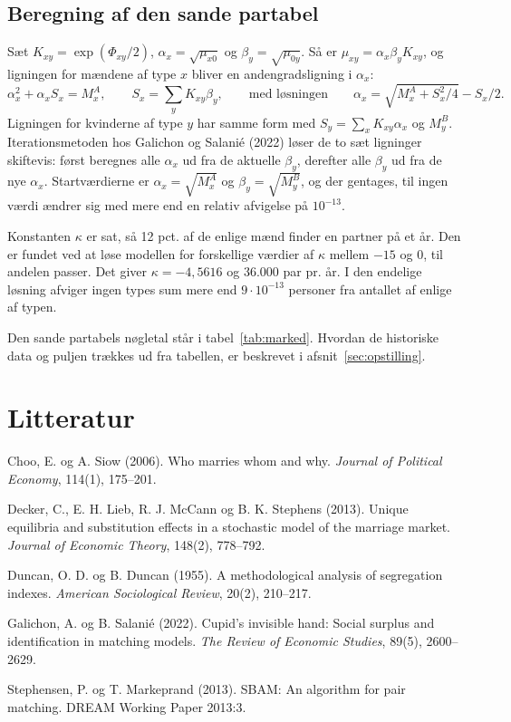 \documentclass[11pt,a4paper]{article}
\begin{document}
\subsection{Beregning af den sande partabel}

Sæt $K_{xy}=\exp(\Phi_{xy}/2)$, $\alpha_x=\sqrt{\mu_{x0}}$ og $\beta_y=\sqrt{\mu_{0y}}$. Så er
$\mu_{xy}=\alpha_x\beta_yK_{xy}$, og ligningen for mændene af type $x$ bliver en andengradsligning i
$\alpha_x$:
\[
\alpha_x^2+\alpha_x S_x=M^A_x, \qquad S_x=\sum_yK_{xy}\beta_y,
\qquad\text{med løsningen}\qquad
\alpha_x=\sqrt{M^A_x+S_x^2/4}-S_x/2 .
\]
Ligningen for kvinderne af type $y$ har samme form med $S_y=\sum_xK_{xy}\alpha_x$ og $M^B_y$.
Iterationsmetoden hos Galichon og Salanié (2022) løser de to sæt ligninger skiftevis: først
beregnes alle $\alpha_x$ ud fra de aktuelle $\beta_y$, derefter alle $\beta_y$ ud fra de nye
$\alpha_x$. Startværdierne er $\alpha_x=\sqrt{M^A_x}$ og $\beta_y=\sqrt{M^B_y}$, og der gentages,
til ingen værdi ændrer sig med mere end en relativ afvigelse på $10^{-13}$.

Konstanten $\kappa$ er sat, så 12 pct. af de enlige mænd finder en partner på et år. Den er fundet
ved at løse modellen for forskellige værdier af $\kappa$ mellem $-15$ og 0, til andelen passer. Det
giver $\kappa=-4{,}5616$ og 36.000 par pr. år. I den endelige løsning afviger ingen types sum mere
end $9\cdot10^{-13}$ personer fra antallet af enlige af typen.

Den sande partabels nøgletal står i tabel~\ref{tab:marked}. Hvordan de historiske data og puljen
trækkes ud fra tabellen, er beskrevet i afsnit~\ref{sec:opstilling}.


\section*{Litteratur}

\small
\begin{description}[leftmargin=1.5em, itemsep=0pt, font=\normalfont]
\item Choo, E. og A. Siow (2006). Who marries whom and why. \emph{Journal of Political Economy},
114(1), 175--201.
\item Decker, C., E. H. Lieb, R. J. McCann og B. K. Stephens (2013). Unique equilibria and
substitution effects in a stochastic model of the marriage market. \emph{Journal of Economic
Theory}, 148(2), 778--792.
\item Duncan, O. D. og B. Duncan (1955). A methodological analysis of segregation indexes.
\emph{American Sociological Review}, 20(2), 210--217.
\item Galichon, A. og B. Salanié (2022). Cupid's invisible hand: Social surplus and identification in
matching models. \emph{The Review of Economic Studies}, 89(5), 2600--2629.
\item Stephensen, P. og T. Markeprand (2013). SBAM: An algorithm for pair matching. DREAM Working
Paper 2013:3.
\end{description}
\end{document}
